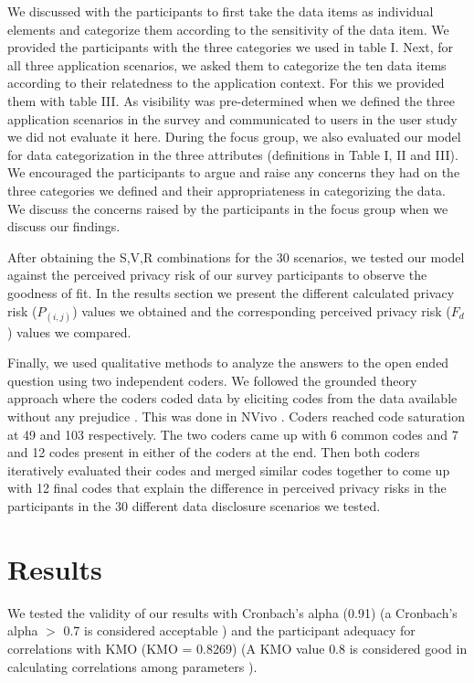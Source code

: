 \documentclass[conference]{IEEEtran}
\begin{document}
We discussed with the participants to first take the data items as individual elements and categorize them according to the sensitivity of the data item. We provided the participants with the three categories we used in table I. Next, for all three application scenarios, we asked them to categorize the ten data items according to their relatedness to the application context. For this we provided them with table III. As visibility was pre-determined when we defined the three application scenarios in the survey and communicated to users in the user study we did not evaluate it here. During the focus group, we also evaluated our model for data categorization in the three attributes (definitions in Table I, II and III). We encouraged the participants to argue and raise any concerns they had on the three categories we defined and their appropriateness in categorizing the data. We discuss the concerns raised by the participants in the focus group when we discuss our findings. 

After obtaining the S,V,R combinations for the 30 scenarios, we tested our model against the perceived privacy risk of our survey participants to observe the goodness of fit. In the results section we present the different calculated privacy risk ($P_(i,j)$) values we obtained and the corresponding perceived privacy risk ($F_d$) values we compared.

Finally, we used qualitative methods to analyze the answers to the open ended question using two independent coders. We followed the grounded theory approach where the coders coded data by eliciting codes from the data available without any prejudice \cite {wong2017eliciting}. This was done in NVivo \cite {saldana2015coding}. Coders reached code saturation at 49 and 103 respectively. The two coders came up with 6 common codes and 7 and 12 codes present in either of the coders at the end. Then both coders iteratively evaluated their codes and merged similar codes together to come up with 12 final codes that explain the difference in perceived privacy risks in the participants in the 30 different data disclosure scenarios we tested.

\section {Results}

We tested the validity of our results with Cronbach's alpha (0.91) (a Cronbach's alpha $>$ 0.7 is considered acceptable \cite {nunnally1967psychometric}) and the participant adequacy for correlations with KMO (KMO =  0.8269) (A KMO value $0.8$ is considered good in calculating correlations among parameters \cite {kim1978factor}). 
\end{document}

